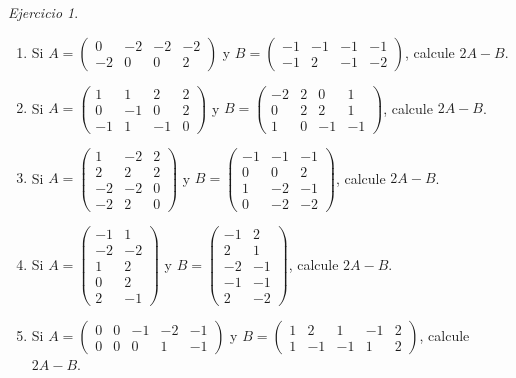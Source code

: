 \documentclass[12pt]{article}
\theoremstyle{remark}
\newtheorem{Ejer}[definicion]{Ejercicio}
\begin{document}
\begin{Ejer}
\begin{enumerate}[start=71]
\item Si $A=\begin{pmatrix}0&-2&-2&-2\\-2&0&0&2\end{pmatrix}$ y $B=\begin{pmatrix}-1&-1&-1&-1\\-1&2&-1&-2\end{pmatrix}$, calcule $2A-B$.

\item Si $A=\begin{pmatrix}1&1&2&2\\0&-1&0&2\\-1&1&-1&0\end{pmatrix}$ y $B=\begin{pmatrix}-2&2&0&1\\0&2&2&1\\1&0&-1&-1\end{pmatrix}$, calcule $2A-B$.

\item Si $A=\begin{pmatrix}1&-2&2\\2&2&2\\-2&-2&0\\-2&2&0\end{pmatrix}$ y $B=\begin{pmatrix}-1&-1&-1\\0&0&2\\1&-2&-1\\0&-2&-2\end{pmatrix}$, calcule $2A-B$.

\item Si $A=\begin{pmatrix}-1&1\\-2&-2\\1&2\\0&2\\2&-1\end{pmatrix}$ y $B=\begin{pmatrix}-1&2\\2&1\\-2&-1\\-1&-1\\2&-2\end{pmatrix}$, calcule $2A-B$.

\item Si $A=\begin{pmatrix}0&0&-1&-2&-1\\0&0&0&1&-1\end{pmatrix}$ y $B=\begin{pmatrix}1&2&1&-1&2\\1&-1&-1&1&2\end{pmatrix}$, calcule $2A-B$.


\end{enumerate}
\end{Ejer}
\end{document}
